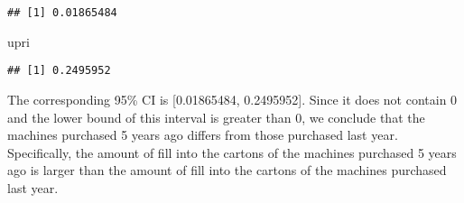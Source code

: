 \documentclass[
]{article}
\newenvironment{Shaded}{\begin{snugshade}}{\end{snugshade}}
\newcommand{\DecValTok}[1]{\textcolor[rgb]{0.00,0.00,0.81}{#1}}
\newcommand{\FloatTok}[1]{\textcolor[rgb]{0.00,0.00,0.81}{#1}}
\newcommand{\FunctionTok}[1]{\textcolor[rgb]{0.00,0.00,0.00}{#1}}
\newcommand{\NormalTok}[1]{#1}
\newcommand{\OtherTok}[1]{\textcolor[rgb]{0.56,0.35,0.01}{#1}}
\newcommand{\SpecialCharTok}[1]{\textcolor[rgb]{0.00,0.00,0.00}{#1}}
\begin{document}
\begin{Shaded}
\end{Shaded}

\begin{verbatim}
## [1] 0.01865484
\end{verbatim}

\begin{Shaded}
\begin{Highlighting}[]
\NormalTok{upri}
\end{Highlighting}
\end{Shaded}

\begin{verbatim}
## [1] 0.2495952
\end{verbatim}

The corresponding 95\% CI is {[}0.01865484, 0.2495952{]}. Since it does
not contain 0 and the lower bound of this interval is greater than 0, we
conclude that the machines purchased 5 years ago differs from those
purchased last year. Specifically, the amount of fill into the cartons
of the machines purchased 5 years ago is larger than the amount of fill
into the cartons of the machines purchased last year.
\end{document}

